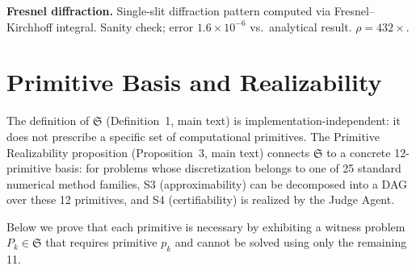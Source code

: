 \documentclass[11pt,a4paper]{article}
\newcommand{\Sclass}{\mathfrak{S}}
\begin{document}
\textbf{Fresnel diffraction.} Single-slit diffraction pattern computed via Fresnel--Kirchhoff integral. Sanity check; error $1.6 \times 10^{-6}$ vs.\ analytical result. $\rho = 432\times$.

\section{Primitive Basis and Realizability}
\label{sec:s4}

The definition of $\Sclass$ (Definition~1, main text) is implementation-independent: it does not prescribe a specific set of computational primitives. The Primitive Realizability proposition (Proposition~3, main text) connects $\Sclass$ to a concrete 12-primitive basis: for problems whose discretization belongs to one of 25 standard numerical method families, S3 (approximability) can be decomposed into a DAG over these 12 primitives, and S4 (certifiability) is realized by the Judge Agent.

Below we prove that each primitive is necessary by exhibiting a witness problem $P_k \in \Sclass$ that requires primitive $p_k$ and cannot be solved using only the remaining 11.
\end{document}
